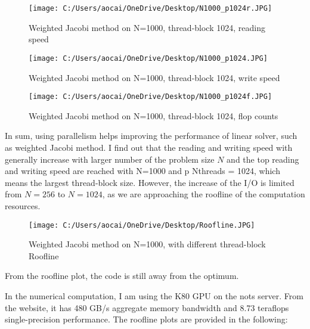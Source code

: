 \documentclass[12pt]{article}
\begin{document}
\begin{figure}[H]
	\centering
	\texttt{[image: C:/Users/aocai/OneDrive/Desktop/N1000\_p1024r.JPG]}
	\caption[Optional caption]{Weighted Jacobi method on N=1000, thread-block 1024, reading speed}
	\label{fig:N1000_p1024r}
\end{figure}
\begin{figure}[H]
	\centering
	\texttt{[image: C:/Users/aocai/OneDrive/Desktop/N1000\_p1024.JPG]}
	\caption[Optional caption]{Weighted Jacobi method on N=1000, thread-block 1024, write speed}
	\label{fig:N1000_p1024w}
\end{figure}
\begin{figure}[H]
	\centering
	\texttt{[image: C:/Users/aocai/OneDrive/Desktop/N1000\_p1024f.JPG]}
	\caption[Optional caption]{Weighted Jacobi method on N=1000, thread-block 1024, flop counts}
	\label{fig:N1000_p1024f}
\end{figure}
In sum, using parallelism helps improving the performance of linear solver, such as weighted Jacobi method. I find out that the reading and writing speed with generally increase with larger number of the problem size $N$ and the top reading and writing speed are reached with N=1000 and p Nthreads = 1024, which means the largest thread-block size. However, the increase of the I/O is limited from $N=256$ to $N=1024$, as we are approaching the roofline of the computation resources.

\begin{figure}[H]
	\centering
	\texttt{[image: C:/Users/aocai/OneDrive/Desktop/Roofline.JPG]}
	\caption[Optional caption]{Weighted Jacobi method on N=1000, with different thread-block Roofline}
	\label{fig:Roofline}
\end{figure}

From the roofline plot, the code is still away from the optimum.

In the numerical computation, I am using the K80 GPU on the nots server. From the website, it has 480 GB/s aggregate memory bandwidth and 8.73 teraflops single-precision performance. The roofline plots are provided in the following:
%
%
%
\end{document}
